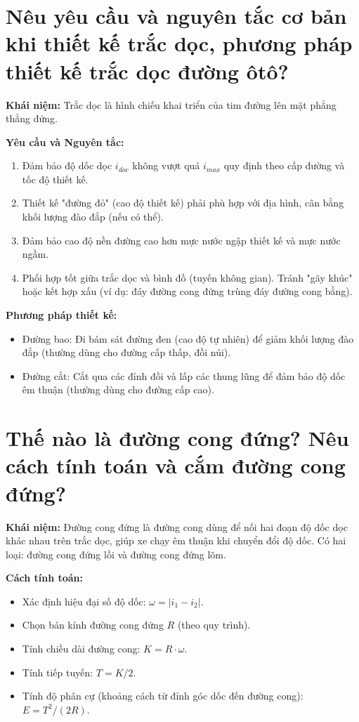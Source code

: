 \documentclass[12pt,a4paper]{article}
\begin{document}
\section{Nêu yêu cầu và nguyên tắc cơ bản khi thiết kế trắc dọc, phương pháp thiết kế trắc dọc đường ôtô?}
\textbf{Khái niệm:} Trắc dọc là hình chiếu khai triển của tim đường lên mặt phẳng thẳng đứng.

\textbf{Yêu cầu và Nguyên tắc:}
\begin{enumerate}
    \item Đảm bảo độ dốc dọc $i_{doc}$ không vượt quá $i_{max}$ quy định theo cấp đường và tốc độ thiết kế.
    \item Thiết kế "đường đỏ" (cao độ thiết kế) phải phù hợp với địa hình, cân bằng khối lượng đào đắp (nếu có thể).
    \item Đảm bảo cao độ nền đường cao hơn mực nước ngập thiết kế và mực nước ngầm.
    \item Phối hợp tốt giữa trắc dọc và bình đồ (tuyến không gian). Tránh "gãy khúc" hoặc kết hợp xấu (ví dụ: đáy đường cong đứng trùng đáy đường cong bằng).
\end{enumerate}

\textbf{Phương pháp thiết kế:}
\begin{itemize}
    \item Đường bao: Đi bám sát đường đen (cao độ tự nhiên) để giảm khối lượng đào đắp (thường dùng cho đường cấp thấp, đồi núi).
    \item Đường cắt: Cắt qua các đỉnh đồi và lấp các thung lũng để đảm bảo độ dốc êm thuận (thường dùng cho đường cấp cao).
\end{itemize}

\section{Thế nào là đường cong đứng? Nêu cách tính toán và cắm đường cong đứng?}
\textbf{Khái niệm:} Đường cong đứng là đường cong dùng để nối hai đoạn độ dốc dọc khác nhau trên trắc dọc, giúp xe chạy êm thuận khi chuyển đổi độ dốc. Có hai loại: đường cong đứng lồi và đường cong đứng lõm.

\textbf{Cách tính toán:}
\begin{itemize}
    \item Xác định hiệu đại số độ dốc: $\omega = |i_1 - i_2|$.
    \item Chọn bán kính đường cong đứng $R$ (theo quy trình).
    \item Tính chiều dài đường cong: $K = R \cdot \omega$.
    \item Tính tiếp tuyến: $T = K / 2$.
    \item Tính độ phân cự (khoảng cách từ đỉnh góc dốc đến đường cong): $E = T^2 / (2R)$.
\end{itemize}
\end{document}
